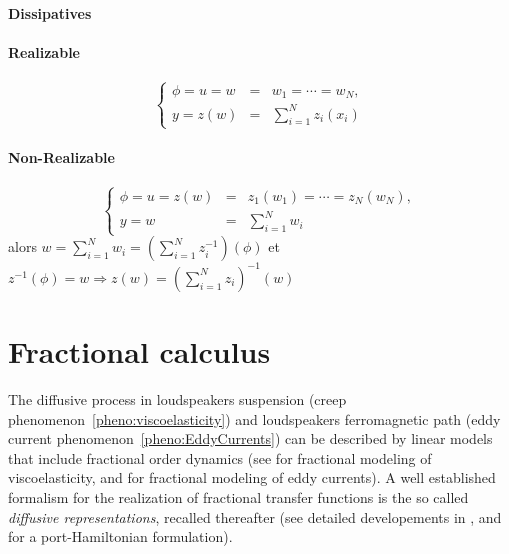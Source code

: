 \documentclass[10pt,a4paper]{article}
\begin{document}
\textbf{Dissipatives}
\paragraph{Realizable} 
$$\left\{ \begin{array}{rcl}
\phi = u =w &=& w_1 =\cdots = w_N ,\\
y =z(w)&= &\sum_{i=1}^N z_i(x_i) 
\end{array}\right.$$
\paragraph{Non-Realizable}
$$\left\{ \begin{array}{rcl}
\phi = u =z(w) &=& z_1(w_1) =\cdots = z_N(w_N) ,\\
y = w &=& \sum_{i=1}^Nw_i\end{array}\right.$$
alors $ w =\sum_{i=1}^N w_i=\left(\sum_{i=1}^N z^{-1}_i\right)(\phi) $ et $z^{-1}(\phi) = w\Rightarrow z(w) =  \left(\sum_{i=1}^N z_i\right)^{-1}(w)$ 


\section{Fractional calculus}
\label{sec:fractional_calculus}
%
The diffusive process in loudspeakers suspension (creep phenomenon~\ref{pheno:viscoelasticity}) and loudspeakers ferromagnetic path (eddy current phenomenon~\ref{pheno:EddyCurrents}) can be described by linear models that include fractional order dynamics (see \cite{koeller1984applications, lewandowski2010identification, hu2011modal, Holm2013621} for fractional modeling of viscoelasticity, and \cite{schafer2008modelling, laudebat2003modelisation, rumeau2009modelisation} for fractional modeling of eddy currents).
%
A well established formalism for the realization of fractional transfer functions is the so called \emph{diffusive representations}, recalled thereafter (see detailed developements in \cite{helie2006representations,helie2006diffusive}, and \cite{le2012diffusive} for a port-Hamiltonian formulation).
%
%
%
%
%
%
%
%
%
%
%
%
%
%
%
%
%
%
%
%
%
%
\end{document}
